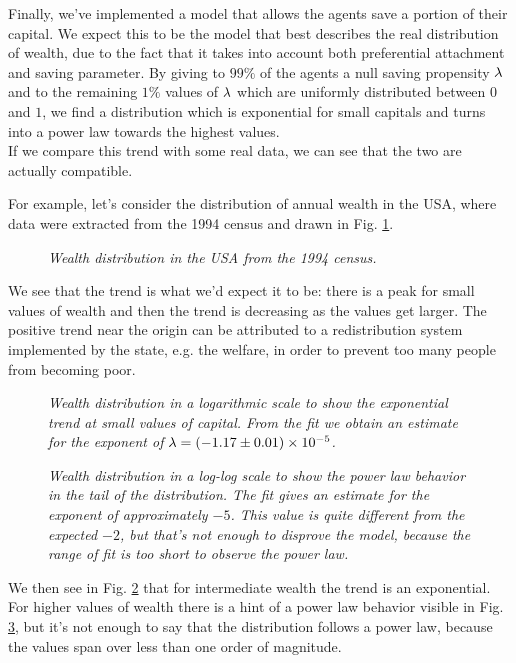 Finally, we've implemented a model that allows the agents save a portion of their capital.
We expect this to be the model that best describes the real distribution of wealth, due to the fact that it takes into account both preferential attachment and saving parameter.
By giving to $99 \%$ of the agents a null saving propensity $\lambda$ and to the remaining $1 \%$ values of $\lambda$ which are uniformly distributed between $0$ and $1$, we find a distribution which is exponential for small capitals and turns into a power law towards the highest values. \\
If we compare this trend with some real data, we can see that the two are actually compatible.

For example, let's consider the distribution of annual wealth in the USA, where data were extracted from the 1994 census and drawn in Fig. \ref{fig:gloabl_realData}.
\begin{figure}[H]
    \centering
    \scalebox{.7}{}
    \caption{\emph{Wealth distribution in the USA from the 1994 census.}}
    \label{fig:gloabl_realData}
\end{figure}
We see that the trend is what we'd expect it to be: there is a peak for small values of wealth and then the trend is decreasing as the values get larger.
The positive trend near the origin can be attributed to a redistribution system implemented by the state, e.g. the welfare, in order to prevent too many people from becoming poor. \\
\begin{figure}[H]
    \centering
    \scalebox{.7}{}
	 \caption{\emph{Wealth distribution in a logarithmic scale to show the exponential trend at small values of capital. From the fit we obtain an estimate for the exponent of $\lambda = (-1.17 \pm 0.01)\times 10^{-5}$.}}
    \label{fig:real_head}
\end{figure}
\begin{figure}[H]
    \centering
    \scalebox{.7}{}
    \caption{\emph{Wealth distribution in a log-log scale to show the power law behavior in the tail of the distribution. The fit gives an estimate for the exponent of approximately $-5$. This value is quite different from the expected $-2$, but that's not enough to disprove the model, because the range of fit is too short to observe the power law.}}
    \label{fig:real_tail}
\end{figure}
We then see in Fig. \ref{fig:real_head} that for intermediate wealth the trend is an exponential.
For higher values of wealth there is a hint of a power law behavior visible in Fig. \ref{fig:real_tail}, but it's not enough to say that the distribution follows a power law, because the values span over less than one order of magnitude.
